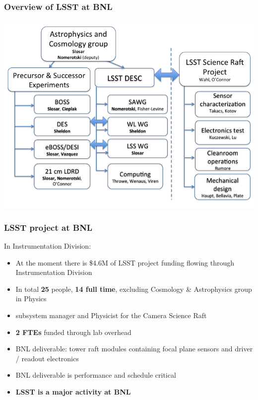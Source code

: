 \documentclass{beamer}
\newcommand{\red}[1]{{\color{red}#1}}
\begin{document}
\begin{frame}
  \frametitle{Overview of LSST  at BNL}

  \begin{center}
    \includegraphics[width=\linewidth]{./chart.png}
  \end{center}
\end{frame}


\begin{frame}
  \frametitle{LSST project at BNL}
  
  In Instrumentation Division:
  \begin{itemize}
  \item At the moment there is \$4.6M  of LSST project funding flowing
    through Instrumentation Division
  \item In total \textbf{25} people, \textbf{14 full time}, 
    excluding Cosmology \& Astrophysics group in Physics
  \item subsystem manager and Physicist for the Camera Science Raft
  \item \textbf{2 FTEs} funded through lab overhead
  \item BNL deliverable: tower raft modules containing focal plane
    sensors and driver / readout electronics
  \item BNL deliverable is performance and schedule critical
  \item \red{\textbf{LSST is a major activity at BNL}}

 \end{itemize}

\end{frame}
\end{document}
